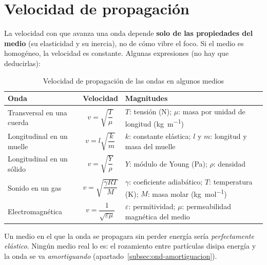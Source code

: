 \section{Velocidad de propagación}\label{sec:ond-velocidad}

La velocidad con que avanza una onda depende \textbf{solo de las propiedades del medio} (su elasticidad y su inercia), no
de cómo vibre el foco. Si el medio es homogéneo, la velocidad es constante. Algunas expresiones (no hay que deducirlas):

\begin{table}[H]
    \centering
    \caption{Velocidad de propagación de las ondas en algunos medios}
    \vspace{-5pt}
    \begin{tabular}{@{}L{4.6cm}cL{6.4cm}@{}}
        \toprule
        \textbf{Onda} & \textbf{Velocidad} & \textbf{Magnitudes} \\
        \midrule
        Transversal en una cuerda & \(v = \sqrt{\dfrac{T}{\mu}}\) & \(T\): tensión (\unit{\newton}); \(\mu\): masa por unidad de longitud (\unit{\kg\per\m}) \\[10pt]
        Longitudinal en un muelle & \(v = l\sqrt{\dfrac{k}{m}}\) & \(k\): constante elástica; \(l\) y \(m\): longitud y masa del muelle \\[10pt]
        Longitudinal en un sólido & \(v = \sqrt{\dfrac{Y}{\rho}}\) & \(Y\): módulo de Young (\unit{\pascal}); \(\rho\): densidad \\[10pt]
        Sonido en un gas & \(v = \sqrt{\dfrac{\gamma R T}{M}}\) & \(\gamma\): coeficiente adiabático; \(T\): temperatura (\unit{\kelvin}); \(M\): masa molar (\unit{\kg\per\mol}) \\[10pt]
        Electromagnética & \(v = \dfrac{1}{\sqrt{\varepsilon\mu}}\) & \(\varepsilon\): permitividad; \(\mu\): permeabilidad magnética del medio \\
        \bottomrule
    \end{tabular}
    \label{tab:ond-velocidades}
\end{table}

Un medio en el que la onda se propagara sin perder energía sería \emph{perfectamente elástico}. Ningún medio real lo es:
el rozamiento entre partículas disipa energía y la onda se va \emph{amortiguando} (apartado~\ref{subsec:ond-amortiguacion}).

